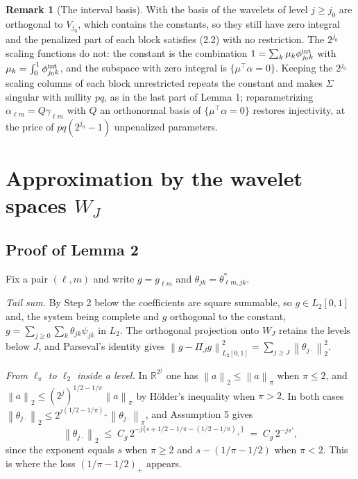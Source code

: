 \documentclass[10pt]{book}
\theoremstyle{definition}
\newtheorem{remark}{Remark}[section]
\newcommand{\R}{\mathbb{R}}
\newcommand{\T}{^{\top}}
\newcommand{\norm}[1]{\left\lVert #1 \right\rVert}
\newcommand{\cv}{\ell}
\newcommand{\md}{m}
\newcommand{\lev}{j}
\newcommand{\tsl}{k}
\newcommand{\jzero}{j_{0}}
\newcommand{\gcomp}[2]{g_{#1#2}}
\newcommand{\wav}[2]{\psi_{#1#2}}
\newcommand{\WJ}{W_{J}}
\newcommand{\PiJ}{\Pi_{J}}
\newcommand{\coefs}[4]{\theta^{*}_{#1#2,#3#4}}
\newcommand{\Gram}{\Sigma}
\newcommand{\seff}{s'}
\begin{document}
\begin{remark}[The interval basis]
\label{rem:cdv}
With the basis of \citet*{cohen1993wavelets} the wavelets of level
$\lev \ge \jzero$ are orthogonal to $V_{\jzero}$, which contains the
constants, so they still have zero integral and the penalized part of each
block satisfies (2.2) with no restriction. The $2^{\jzero}$ scaling functions
do not: the constant is the combination $1 = \sum_{\tsl}\mu_{\tsl}
\phi^{\rm int}_{\jzero\tsl}$ with
$\mu_{\tsl} = \int_0^1\phi^{\rm int}_{\jzero\tsl}$, and the subspace with zero
integral is $\{\mu\T\alpha = 0\}$. Keeping the $2^{\jzero}$ scaling columns of
each block unrestricted repeats the constant and makes $\Gram$ singular with
nullity $pq$, as in the last part of Lemma 1; reparametrizing
$\alpha_{\cv\md} = Q\gamma_{\cv\md}$ with $Q$ an orthonormal basis of
$\{\mu\T\alpha = 0\}$ restores injectivity, at the price of
$pq(2^{\jzero}-1)$ unpenalized parameters.
\end{remark}

\section[\texorpdfstring{Approximation by the wavelet spaces $\WJ$}{Approximation by the wavelet spaces W\_J}]{Approximation by the wavelet \texorpdfstring{\textcolor{colR1}{spaces $\WJ$}}{spaces W\_J}}
\setcounter{equation}{0}

\subsection*{Proof of Lemma 2}

Fix a pair $(\cv,\md)$ and write $g = \gcomp{\cv}{\md}$ and
$\theta_{\lev\tsl} = \coefs{\cv}{\md}{\lev}{\tsl}$.

\emph{Tail sum.} By Step 2 below the coefficients are square summable, so
$g \in L_2[0,1]$ and, the system being complete and $g$ orthogonal to the
constant, $g = \sum_{\lev\ge0}\sum_{\tsl}\theta_{\lev\tsl}\wav{\lev}{\tsl}$ in
$L_2$. The orthogonal projection onto $\WJ$ retains the levels below $J$, and
Parseval's identity gives
$\norm{g-\PiJ g}^2_{L_2[0,1]} = \sum_{\lev\ge J}
\norm{\theta_{\lev\cdot}}_2^2$.

\emph{From $\ell_\pi$ to $\ell_2$ inside a level.} In $\R^{2^{\lev}}$ one has
$\norm{a}_2 \le \norm{a}_{\pi}$ when $\pi \le 2$, and
$\norm{a}_2 \le (2^{\lev})^{1/2-1/\pi}\norm{a}_{\pi}$ by Hölder's inequality
when $\pi > 2$. In both cases $\norm{\theta_{\lev\cdot}}_2 \le
2^{\lev(1/2-1/\pi)_{+}}\norm{\theta_{\lev\cdot}}_{\pi}$, and
Assumption 5 gives
\[
  \norm{\theta_{\lev\cdot}}_2 \;\le\;
  C_g\,2^{-\lev\{s+1/2-1/\pi-(1/2-1/\pi)_{+}\}}
  \;=\; C_g\,2^{-\lev\seff},
\]
since the exponent equals $s$ when $\pi \ge 2$ and $s-(1/\pi-1/2)$ when
$\pi < 2$. This is where the loss $(1/\pi-1/2)_{+}$ appears.
\end{document}
